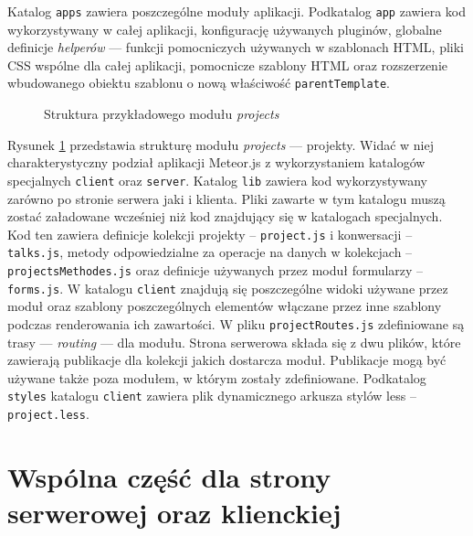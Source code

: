 Katalog \verb|apps| zawiera poszczególne moduły aplikacji. Podkatalog \verb|app| zawiera kod wykorzystywany w całej aplikacji, konfigurację używanych pluginów, globalne definicje \textit{helperów} --- funkcji pomocniczych używanych w szablonach HTML, pliki CSS wspólne dla całej aplikacji, pomocnicze szablony HTML oraz rozszerzenie wbudowanego obiektu szablonu o nową właściwość \verb|parentTemplate|.

\begin{figure}[h]
{}
  \caption{Struktura przykładowego modułu \emph{projects}}
  \label{fig:app_project_structure}
\end{figure}

Rysunek \ref{fig:app_project_structure} przedstawia strukturę modułu \emph{projects} --- projekty. Widać w niej charakterystyczny podział aplikacji Meteor.js z wykorzystaniem katalogów specjalnych \verb|client| oraz \verb|server|. Katalog \verb|lib| zawiera kod wykorzystywany zarówno po stronie serwera jaki i klienta. Pliki zawarte w tym katalogu muszą zostać załadowane wcześniej niż kod znajdujący się w katalogach specjalnych. Kod ten zawiera definicje kolekcji projekty -- \verb|project.js| i konwersacji -- \verb|talks.js|, metody odpowiedzialne za operacje na danych w kolekcjach -- \verb|projectsMethodes.js| oraz definicje używanych przez moduł formularzy -- \verb|forms.js|. W katalogu \verb|client| znajdują się poszczególne widoki używane przez moduł oraz szablony poszczególnych elementów włączane przez inne szablony podczas renderowania ich zawartości. W pliku \verb|projectRoutes.js| zdefiniowane są trasy --- \textit{routing} --- dla modułu. Strona serwerowa składa się z dwu plików, które zawierają publikacje dla kolekcji jakich dostarcza moduł. Publikacje mogą być używane także poza modułem, w którym zostały zdefiniowane. Podkatalog \verb|styles| katalogu \verb|client| zawiera plik dynamicznego arkusza stylów less -- \verb|project.less|.

\section{Wspólna część dla strony serwerowej oraz klienckiej}

